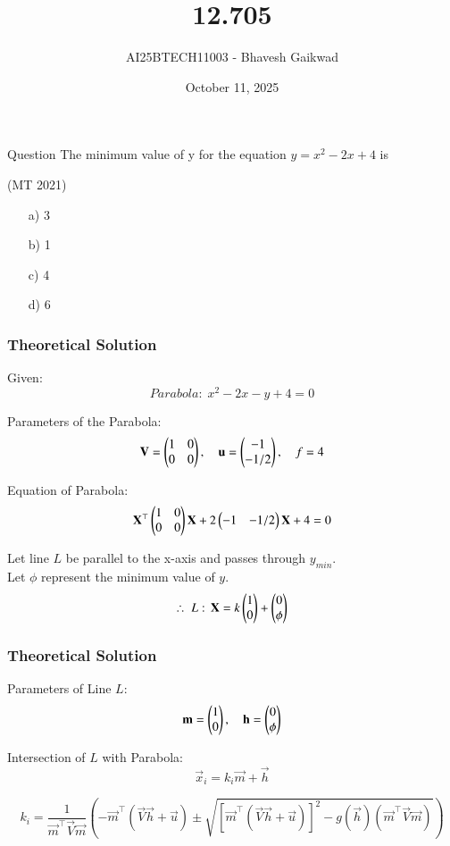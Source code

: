 \documentclass{beamer}
\title
{12.705}
\date{October 11, 2025}
\author 
{AI25BTECH11003 - Bhavesh Gaikwad}
\begin{document}
\frame{\titlepage}
\begin{frame}{Question}
The minimum value of y for the equation $y = x^2 - 2x + 4$ is

\hfill{(MT 2021)}

\begin{itemize}
    \item[a)]3
    \item[b)]1
    \item[c)]4
    \item[d)]6
\end{itemize}

\end{frame}


\begin{frame}[fragile]
    \frametitle{Theoretical Solution}
Given:
\begin{equation}
 Parabola: \;   x^2 - 2x - y + 4 =0
\end{equation}

Parameters of the Parabola:
\begin{equation}
    \mathbf{V} = \begin{pmatrix}1 & 0 \\ 0 & 0\end{pmatrix}, \quad \mathbf{u} = \begin{pmatrix}-1 \\ -1/2\end{pmatrix}, \quad f = 4
\end{equation}

Equation of Parabola:
\begin{equation}
\mathbf{X}^\top\begin{pmatrix}1 & 0 \\ 0 & 0\end{pmatrix}\mathbf{X} + 2\begin{pmatrix}-1 & -1/2\end{pmatrix}\mathbf{X} + 4 = 0    
\end{equation}

Let line $L$ be parallel to the x-axis and passes through $y_{min}$.\\
Let $\phi$ represent the minimum value of $y$.
\begin{equation}
    \therefore \; L: \, \mathbf{X} = k\begin{pmatrix} 1 \\ 0\end{pmatrix} + \begin{pmatrix}0 \\ \phi\end{pmatrix}
\end{equation}
\end{frame}

\begin{frame}[fragile]
\frametitle{Theoretical Solution}

Parameters of Line $L$:
\begin{equation}
\mathbf{m}= \begin{pmatrix}1 \\ 0\end{pmatrix}, \quad \mathbf{h} = \begin{pmatrix}0 \\ \phi\end{pmatrix}    
\end{equation}

Intersection of $L$ with Parabola:
\begin{equation}
    \vec{x}_i = k_i\vec{m} + \vec{h}
\end{equation}

\begin{equation}
    k_i = \dfrac{1}{\vec{m}^\top\vec{V}\vec{m}}\left( -\vec{m}^\top(\vec{V}\vec{h}+\vec{u})\pm \sqrt{[\vec{m}^\top(\vec{V}\vec{h}+\vec{u})]^2 - g(\vec{h})(\vec{m}^\top\vec{V}\vec{m})} \right)
\end{equation}
\end{frame}
\end{document}
